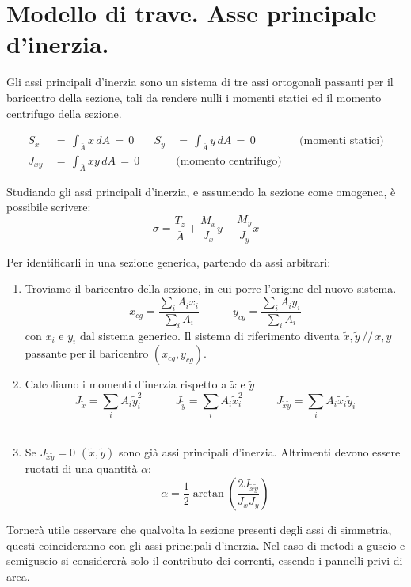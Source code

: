 \section{Modello di trave. Asse principale d'inerzia.}

\begin{definizioneBox}
    Gli assi principali d'inerzia sono un sistema di tre assi ortogonali passanti per il baricentro della sezione, tali da rendere nulli i momenti statici ed il momento centrifugo della sezione.
\end{definizioneBox}




\begin{align*}
    S_x \, &=\, \int_{\bar{A}} x \, dA \,=\,0 \quad & S_y \, &=\, \int_{\bar{A}} y \, dA\,=\,0 &&\text{(momenti statici)}\\
    J_{xy} \, &=\, \int_{\bar{A}} xy \, dA\,=\,0 &&\text{(momento centrifugo)}
\end{align*}

Studiando gli assi principali d'inerzia, e assumendo la sezione come omogenea, è possibile scrivere:
\begin{equation*}
        \sigma = \frac{T_z}{\bar{A}} +  \frac{M_x}{J_x}y -\frac{M_y}{J_y}x 
 \end{equation*}

 Per identificarli in una sezione generica, partendo da assi arbitrari:
 \begin{enumerate}
     \item Troviamo il baricentro della sezione, in cui porre l'origine del nuovo sistema.
     \begin{equation*}
     x_{cg} = \frac{\sum_i A_i x_i}{\sum_i A_i} \quad\quad\quad
     y_{cg} = \frac{\sum_i A_i y_i}{\sum_i A_i}
    \end{equation*}
    con $x_i$ e $y_i$ dal sistema generico. Il sistema di riferimento diventa $\tilde{x}, \tilde{y} \,//\,x,y$ passante per il baricentro $(x_{cg},y_{cg})$.\\
    \item Calcoliamo i momenti d'inerzia rispetto a $\tilde{x}$ e $\tilde{y}$
    \begin{equation*}
     J_{\tilde{x}} = \sum_i A_i \tilde{y}_i^2 \quad\quad\quad
     J_{\tilde{y}} = \sum_i A_i \tilde{x}_i^2 \quad\quad\quad
     J_{\tilde{x}\tilde{y}} = \sum_i A_i \tilde{x}_i \tilde{y}_i
    \end{equation*}\\
    \item Se $ J_{\tilde{x}\tilde{y}} = 0$ $(\tilde{x},\tilde{y})$ sono già assi principali d'inerzia. Altrimenti devono essere ruotati di una quantità $\alpha$:
    \begin{equation*}
        \alpha = \frac{1}{2} \arctan\left(\frac{2 J_{\tilde{x}\tilde{y}} }{J_{\tilde{x}} J_{\tilde{y}} }\right)
    \end{equation*}
 \end{enumerate}

 Tornerà utile osservare che qualvolta la sezione presenti degli assi di simmetria, questi coincideranno con gli assi principali d'inerzia. Nel caso di metodi a guscio e semiguscio si considererà solo il contributo dei correnti, essendo i pannelli privi di area.



